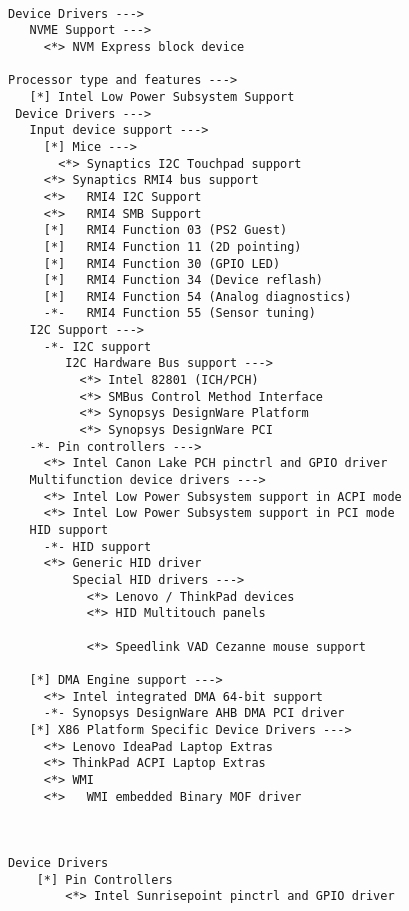\documentclass[10pt, a4paper, onecolumn, openany]{book}         %
\begin{document}
\begin{Verbatim}[commandchars=\\\{\}]
      
Device Drivers --->
   NVME Support --->
     <*> NVM Express block device

Processor type and features --->
   [*] Intel Low Power Subsystem Support
 Device Drivers --->
   Input device support --->
     [*] Mice --->
       <*> Synaptics I2C Touchpad support
     <*> Synaptics RMI4 bus support
     <*>   RMI4 I2C Support
     <*>   RMI4 SMB Support
     [*]   RMI4 Function 03 (PS2 Guest)
     [*]   RMI4 Function 11 (2D pointing)
     [*]   RMI4 Function 30 (GPIO LED)
     [*]   RMI4 Function 34 (Device reflash)
     [*]   RMI4 Function 54 (Analog diagnostics)
     -*-   RMI4 Function 55 (Sensor tuning)
   I2C Support --->
     -*- I2C support
        I2C Hardware Bus support --->
          <*> Intel 82801 (ICH/PCH)
          <*> SMBus Control Method Interface
          <*> Synopsys DesignWare Platform
          <*> Synopsys DesignWare PCI
   -*- Pin controllers --->
     <*> Intel Canon Lake PCH pinctrl and GPIO driver
   Multifunction device drivers --->
     <*> Intel Low Power Subsystem support in ACPI mode
     <*> Intel Low Power Subsystem support in PCI mode
   HID support
     -*- HID support
     <*> Generic HID driver
         Special HID drivers --->
           <*> Lenovo / ThinkPad devices
           <*> HID Multitouch panels
           
           <*> Speedlink VAD Cezanne mouse support
           
   [*] DMA Engine support --->
     <*> Intel integrated DMA 64-bit support
     -*- Synopsys DesignWare AHB DMA PCI driver
   [*] X86 Platform Specific Device Drivers --->
     <*> Lenovo IdeaPad Laptop Extras
     <*> ThinkPad ACPI Laptop Extras
     <*> WMI
     <*>   WMI embedded Binary MOF driver    
     
     
     
Device Drivers 
    [*] Pin Controllers
        <*> Intel Sunrisepoint pinctrl and GPIO driver

\end{Verbatim}
\end{document}
